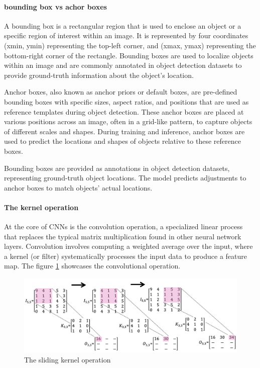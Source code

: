 \documentclass[a4paper,10pt,twocolumn]{article}
\numberwithin{figure}{section}
\numberwithin{table}{section}
\begin{document}
\paragraph{bounding box vs achor boxes}
 A bounding box is a rectangular region that is used to 
 enclose an object or a specific region of interest 
 within an image. It is represented by four 
 coordinates (xmin, ymin) representing 
 the top-left corner, and (xmax, ymax) 
 representing the bottom-right corner of the 
 rectangle. Bounding boxes are used to localize 
 objects within an image and are commonly annotated 
 in object detection datasets to provide ground-truth 
 information about the object’s location.

 Anchor boxes, also known as anchor priors or default 
 boxes, are pre-defined bounding boxes with specific 
 sizes, aspect ratios, and positions that are used as 
 reference templates during object detection. 
 These anchor boxes are placed at various positions
  across an image, often in a grid-like pattern, to
   capture objects of different scales and shapes. 
   During training and inference, anchor boxes are 
   used to predict the locations and shapes of objects
    relative to these reference boxes.

    Bounding boxes are provided as annotations in object detection datasets, representing ground-truth object locations.
    The model predicts adjustments to anchor boxes to match objects’ actual locations.

\paragraph{The kernel operation}
At the core of CNNs is the convolution operation, a specialized linear process that replaces 
the typical matrix multiplication found in other neural network layers. Convolution involves 
computing a weighted average over the input, where a kernel (or filter) systematically processes
 the input data to produce a feature map. The figure \ref{fig:kernel} showcases the convolutional 
 operation.


\begin{figure}[htbp]
    \centering
    \includegraphics[width=1\linewidth]{kernel.png}  %
    \caption{The sliding kernel operation}
    \label{fig:kernel}  
\end{figure}
\end{document}
